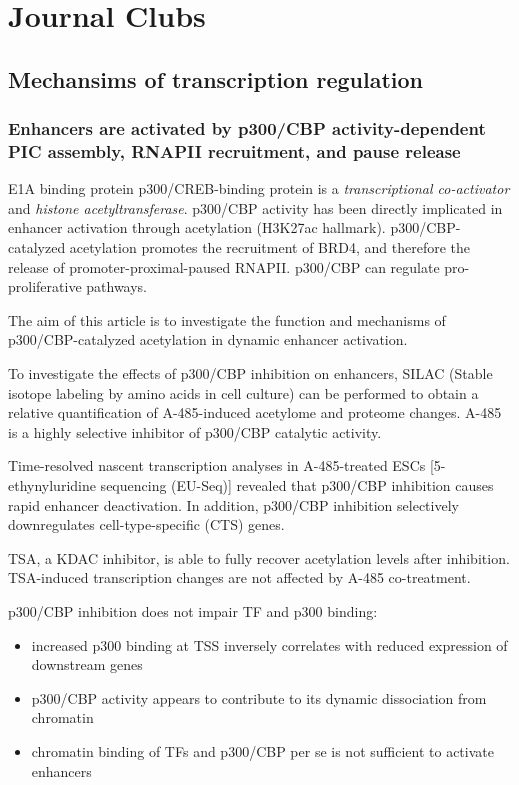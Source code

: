 \graphicspath{{chapters/_resources/}}

\chapter{Journal Clubs}

\section{Mechansims of transcription regulation}
\subsection{Enhancers are activated by p300/CBP activity-dependent PIC assembly, RNAPII recruitment, and pause release}

E1A binding protein p300/CREB-binding protein is a \emph{transcriptional co-activator} and \emph{histone acetyltransferase}. p300/CBP activity has been directly implicated in enhancer activation through acetylation (H3K27ac hallmark). p300/CBP-catalyzed acetylation promotes the recruitment of BRD4, and therefore the release of promoter-proximal-paused RNAPII. p300/CBP can regulate pro-proliferative pathways.

The aim of this article is to investigate the function and mechanisms of p300/CBP-catalyzed acetylation in dynamic enhancer activation.

To investigate the effects of p300/CBP inhibition on enhancers, SILAC (Stable isotope labeling by amino acids in cell culture) can be performed to obtain a relative quantification of A-485-induced acetylome and proteome changes. A-485 is a highly selective inhibitor of p300/CBP catalytic activity. 

Time-resolved nascent transcription analyses in A-485-treated ESCs [5-ethynyluridine sequencing (EU-Seq)] revealed that p300/CBP inhibition causes rapid enhancer deactivation. In addition, p300/CBP inhibition selectively downregulates cell-type-specific (CTS) genes.

TSA, a KDAC inhibitor, is able to fully recover acetylation levels after inhibition. TSA-induced transcription changes are not affected by A-485 co-treatment.

p300/CBP inhibition does not impair TF and p300 binding:
\begin{itemize}
\tightlist
\item increased p300 binding at TSS inversely correlates with reduced expression of downstream genes
\item p300/CBP activity appears to contribute to its dynamic dissociation from chromatin
\item chromatin binding of TFs and p300/CBP per se is not sufficient to activate enhancers
\end{itemize}

